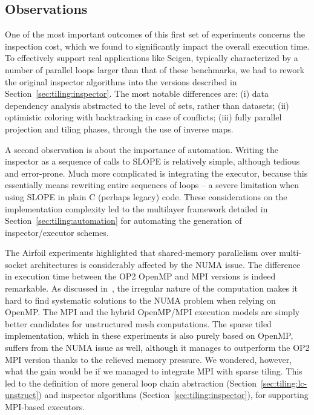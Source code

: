 \subsection{Observations}
\label{sec:tiling:bench:conc}
One of the most important outcomes of this first set of experiments concerns the inspection cost, which we found to significantly impact the overall execution time. To effectively support real applications like Seigen, typically characterized by a number of parallel loops larger than that of these benchmarks, we had to rework the original inspector algorithms into the versions described in Section~\ref{sec:tiling:inspector}. The most notable differences are: (i) data dependency analysis abstracted to the level of sets, rather than datasets; (ii) optimistic coloring with backtracking in case of conflicts; (iii) fully parallel projection and tiling phases, through the use of inverse maps. 

A second observation is about the importance of automation. Writing the inspector as a sequence of calls to SLOPE is relatively simple, although tedious and error-prone. Much more complicated is integrating the executor, because this essentially means rewriting entire sequences of loops -- a severe limitation when using SLOPE in plain C (perhaps legacy) code. These considerations on the implementation complexity led to the multilayer framework detailed in Section~\ref{sec:tiling:automation} for automating the generation of inspector/executor schemes. 

The Airfoil experiments highlighted that shared-memory parallelism over multi-socket architectures is considerably affected by the NUMA issue. The difference in execution time between the OP2 OpenMP and MPI versions is indeed remarkable. As discussed in~\cite{hydra-op2}, the irregular nature of the computation makes it hard to find systematic solutions to the NUMA problem when relying on OpenMP. The MPI and the hybrid OpenMP/MPI execution models are simply better candidates for unstructured mesh computations. The sparse tiled implementation, which in these experiments is also purely based on OpenMP, suffers from the NUMA issue as well, although it manages to outperform the OP2 MPI version thanks to the relieved memory pressure. We wondered, however, what the gain would be if we managed to integrate MPI with sparse tiling. This led to the definition of more general loop chain abstraction (Section~\ref{sec:tiling:lc-unstruct}) and inspector algorithms (Section~\ref{sec:tiling:inspector}), for supporting MPI-based executors.

